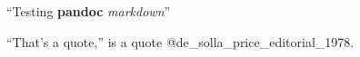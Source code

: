 ``Testing \textbf{pandoc} \emph{markdown}''

``That's a quote,'' is a quote @de\_solla\_price\_editorial\_1978.
